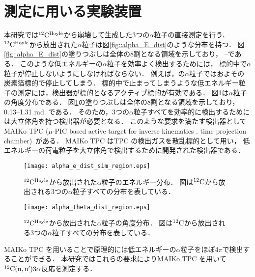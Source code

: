 \documentclass[../master]{subfiles}
\begin{document}
\section{測定に用いる実験装置}
\label{seq::detector_using_experiment}
本研究では${}^{12}{\rm C}^{\rm Hoyle}$から崩壊して生成した3つの$\alpha$粒子の直接測定を行う．
${}^{12}{\rm C}^{\rm Hoyle}$から放出された$\alpha$粒子は図\ref{fig::alpha_E_dist}のような分布を持つ．
図\ref{fig::alpha_E_dist}の塗りつぶしは全体の8割となる領域を示しており，
--である．
このような低エネルギーの$\alpha$粒子を効率よく検出するためには，
標的中で$\alpha$粒子が停止しないようにしなければならない．
例えば，の$\alpha$粒子ではおよその
炭素箔標的で停止してしまう．
標的中で止まってしまうような低エネルギー粒子の測定には，検出器が標的となるアクティブ標的が有効である．
図\ref{fig::alpha_theta_dist}は$\alpha$粒子の角度分布である．
図\ref{fig::alpha_theta_dist}の塗りつぶしは全体の8割となる領域を示しており，
0.13--1.31 rad. である．
そのため，3つの$\alpha$粒子すべてを効率的に検出するためには大立体角を持つ検出器が必要となる．
このような要求を満たす検出器としてMAIKo TPC ($\mu$-PIC based active target for inverse kinematics .
time projection chamber)~\cite{maiko, mupic}がある．
MAIKo TPC はTPC の検出ガスを散乱標的として用い，
低エネルギーの荷電粒子を大立体角で検出するために開発された検出器である．
\begin{figure}
  \centering
  \texttt{[image: alpha\_e\_dist\_sim\_region.eps]}
  \caption[${}^{12}{\rm C}^{\rm Hoyle}$から放出された$\alpha$粒子のエネルギー分布．]
          {${}^{12}{\rm C}^{\rm Hoyle}$から放出された$\alpha$粒子のエネルギー分布．
            図は${}^{12}{\rm C}$から放出される3つの$\alpha$粒子すべての分布を表している．}
  \label{fig::alpha_E_dist}
  \texttt{[image: alpha\_theta\_dist\_region.eps]}
  \caption[${}^{12}{\rm C}^{\rm Hoyle}$から放出された$\alpha$粒子の角度分布．]
          {${}^{12}{\rm C}^{\rm Hoyle}$から放出された$\alpha$粒子の角度分布．
            図は${}^{12}{\rm C}$から放出される3つの$\alpha$粒子すべての分布を表している．
          }
  \label{fig::alpha_theta_dist}
\end{figure}
MAIKo TPC を用いることで原理的には低エネルギーの$\alpha$粒子をほぼ4$\pi$で検出することができる．
本研究ではこれらの要求によりMAIKo TPC を用いて${}^{12}{\rm C}({\rm n},{\rm n}')3\alpha$反応を測定する．
\end{document}
